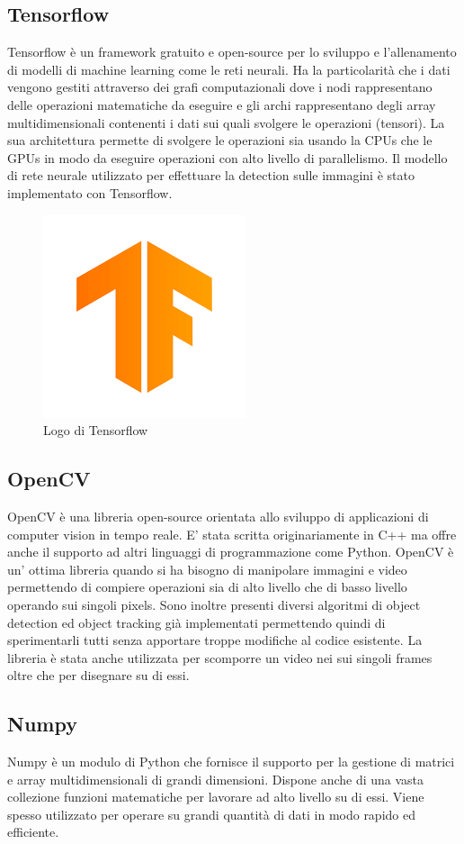 \subsection{Tensorflow}
Tensorflow è un framework gratuito e open-source per lo sviluppo e l'allenamento di modelli di machine learning come le reti neurali. Ha la particolarità che i dati vengono gestiti attraverso dei grafi computazionali dove i nodi rappresentano delle operazioni matematiche da eseguire e gli archi rappresentano degli array multidimensionali contenenti i dati sui quali svolgere le operazioni (tensori). La sua architettura permette di svolgere le operazioni sia usando la CPUs che le GPUs in modo da eseguire operazioni con alto livello di parallelismo. Il modello di rete neurale utilizzato per effettuare la detection sulle immagini è stato implementato con Tensorflow.
\begin{figure}[H]
	\centering
	\includegraphics[width=0.3\linewidth]{images/logo-tensorflow.png}
	\caption{Logo di Tensorflow}
	\label{Logo di Tensorflow}
\end{figure}
\subsection{OpenCV}
OpenCV è una libreria open-source orientata allo sviluppo di applicazioni di computer vision in tempo reale. E' stata scritta originariamente in C++ ma offre anche il supporto ad altri linguaggi di programmazione come Python. OpenCV è un' ottima libreria quando si ha bisogno di manipolare immagini e video permettendo di compiere operazioni sia di alto livello che di basso livello operando sui singoli pixels. Sono inoltre presenti diversi algoritmi di object detection ed object tracking già implementati permettendo quindi di sperimentarli tutti senza apportare troppe modifiche al codice esistente. La libreria è stata anche utilizzata per scomporre un video nei sui singoli frames oltre che per disegnare su di essi.
\subsection{Numpy}
Numpy è un modulo di Python che fornisce il supporto per
la gestione di matrici e array multidimensionali di grandi dimensioni. Dispone anche di una vasta collezione funzioni matematiche per lavorare ad alto livello su di essi. Viene spesso utilizzato per operare su grandi quantità di dati in modo rapido ed efficiente.
